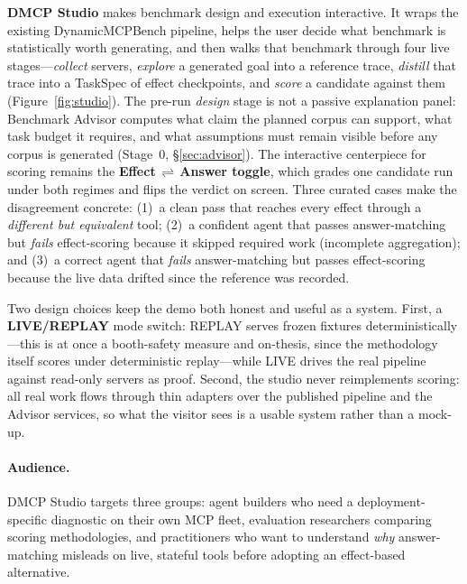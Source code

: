 \textbf{DMCP Studio} makes benchmark design and execution interactive. It wraps
the existing DynamicMCPBench pipeline, helps the user decide what benchmark is
statistically worth generating, and then walks that benchmark through four live
stages---\emph{collect} servers, \emph{explore} a generated goal into a
reference trace, \emph{distill} that trace into a TaskSpec of effect
checkpoints, and \emph{score} a candidate against them
(Figure~\ref{fig:studio}). The pre-run \emph{design} stage is not a passive
explanation panel: Benchmark Advisor computes what claim the planned corpus can
support, what task budget it requires, and what assumptions must remain visible
before any corpus is generated (Stage~0, \S\ref{sec:advisor}). The interactive
centerpiece for scoring remains the
\textbf{Effect\,$\rightleftharpoons$\,Answer toggle}, which grades one
candidate run under both regimes and flips the verdict on screen. Three curated
cases make the disagreement concrete: (1)~a clean pass that reaches every effect
through a \emph{different but equivalent} tool; (2)~a confident agent that
passes answer-matching but \emph{fails} effect-scoring because it skipped
required work (incomplete aggregation); and (3)~a correct agent that
\emph{fails} answer-matching but passes effect-scoring because the live data
drifted since the reference was recorded.

Two design choices keep the demo both honest and useful as a system. First, a
\textbf{LIVE/REPLAY} mode switch: REPLAY serves frozen fixtures
deterministically---this is at once a booth-safety measure and on-thesis, since
the methodology itself scores under deterministic replay---while LIVE drives the
real pipeline against read-only servers as proof. Second, the studio never
reimplements scoring: all real work flows through thin adapters over the
published pipeline and the Advisor services, so what the visitor sees is a
usable system rather than a mock-up.

\paragraph{Audience.} DMCP Studio targets three groups: agent builders who
need a deployment-specific diagnostic on their own MCP fleet, evaluation
researchers comparing scoring methodologies, and practitioners who want to
understand \emph{why} answer-matching misleads on live, stateful tools before
adopting an effect-based alternative.

